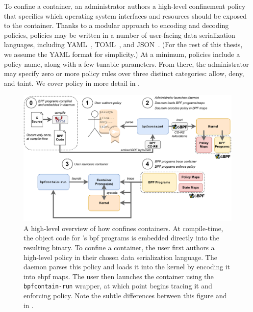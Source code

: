 To confine a container, an administrator authors a high-level confinement policy that
specifies which operating system interfaces and resources should be exposed to the
container.  Thanks to a modular approach to encoding and decoding policies, \bpfcontain{}
policies may be written in a number of user-facing data serialization languages, including
YAML~\cite{yaml}, TOML~\cite{toml}, and JSON~\cite{json}. (For the rest of this thesis, we
assume the YAML format for simplicity.) At a minimum, \bpfcontain{} policies include
a policy name, along with a few tunable parameters. From there, the administrator may
specify zero or more policy rules over three distinct categories: allow, deny, and taint.
We cover \bpfcontain{} policy in more detail in .

\begin{figure}[htpb]
  \centering
  \includegraphics[width=1\linewidth]{figs/bpfcontain/overview.pdf}
  \caption[A high-level overview of how \bpfcontain{} confines containers]{
    A high-level overview of how \bpfcontain{} confines containers.  At compile-time,
    the object code for \bpfcontain{}'s \gls{bpf} programs is embedded directly into the
    resulting binary. To confine a container, the user first authors a high-level policy
    in their chosen data serialization language. The daemon parses this policy and loads
    it into the kernel by encoding it into \gls{ebpf} maps. The user then launches the
    container using the \texttt{bpfcontain-run} wrapper, at which point \bpfcontain{}
    begins tracing it and enforcing policy. Note the subtle differences between this
    figure and  in .
  }%
  \label{fig:bpfcontain-overview}
\end{figure}

